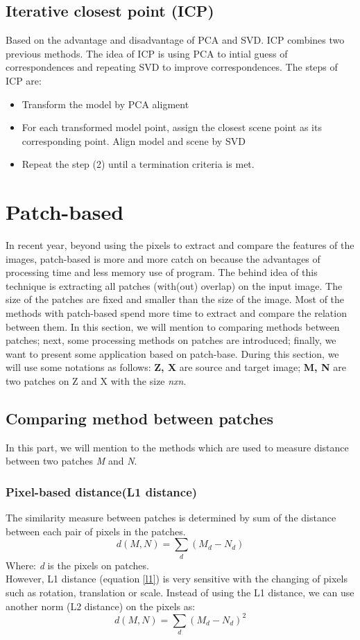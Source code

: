 \subsection{Iterative closest point (ICP)}
Based on the advantage and disadvantage of PCA and SVD. ICP combines two previous methods. The idea of ICP is using PCA to intial guess of correspondences and repeating SVD to improve correspondences. The steps of ICP are:
\begin{itemize}
	\item Transform the model by PCA aligment
	\item For each transformed model point, assign the closest scene point as its corresponding point. Align model and scene by SVD
	\item Repeat the step (2) until a termination criteria is met.
\end{itemize}
\section{Patch-based}
In recent year, beyond using the pixels to extract and compare the features of the images, patch-based is more and more catch on because the advantages of processing time and less memory use of program. The behind idea of this technique is extracting all patches (with(out) overlap) on the input image. The size of the patches are fixed and smaller than the size of the image. Most of the methods with patch-based spend more time to extract and compare the relation between them. In this section, we will mention to comparing methods between patches; next, some processing methods on patches are introduced; finally, we want to present some application based on patch-base. During this section, we will use some notations as follows: \textbf{Z, X} are source and target image; \textbf{M, N} are two patches on Z and X with the size \textit{nxn}.
\subsection{Comparing method between patches}
In this part, we will mention to the methods which are used to measure distance between two patches \textit{M} and \textit{N}.
\subsubsection{Pixel-based distance(L1 distance)}
The similarity measure between patches is determined by sum of the distance between each pair of pixels in the patches.
\begin{equation}\label{l1}
	d(M,N) = \sum_d(M_d - N_d)
\end{equation}
Where: \textit{d} is the pixels on patches.\\[0.2cm]
However, L1 distance (equation \ref{l1}) is very sensitive with the changing of pixels such as rotation, translation or scale. Instead of using the L1 distance, we can use another norm (L2 distance) on the pixels as:
\begin{equation}\label{l2}
	d(M,N) = \sum_d(M_d - N_d)^2
\end{equation}

